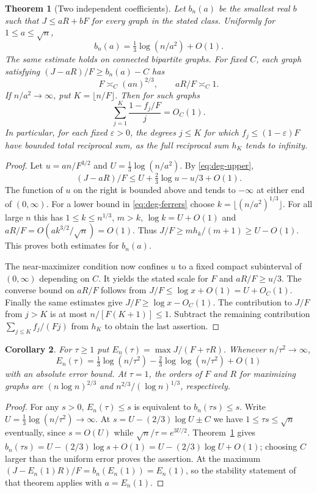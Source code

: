 \documentclass[11pt,a4paper]{article}
\newtheorem{theorem}{Theorem}[section]
\newtheorem{corollary}[theorem]{Corollary}
\theoremstyle{remark}\newtheorem*{remark}{Remark}
\begin{document}
\begin{theorem}[Two independent coefficients]\label{thm:degree-envelope}
Let $b_n(a)$ be the smallest real $b$ such that $J\le aR+bF$ for every
graph in the stated class. Uniformly for $1\le a\le\sqrt n$,
\[
 b_n(a)=\tfrac13\log(n/a^2)+O(1).
\]
The same estimate holds on connected bipartite graphs. For fixed $C$,
each graph satisfying $(J-aR)/F\ge b_n(a)-C$ has
\[
 F\asymp_C(an)^{2/3},\qquad aR/F\asymp_C1 .
\]
If $n/a^2\to\infty$, put $K=\lfloor n/F\rfloor$. Then for such graphs
\[
 \sum_{j=1}^K\frac{1-f_j/F}{j}=O_C(1).
\]
In particular, for each fixed $\varepsilon>0$, the degrees $j\le K$ for
which $f_j\le(1-\varepsilon)F$ have bounded total reciprocal sum, as
the full reciprocal sum $h_K$ tends to infinity.
\end{theorem}
\begin{proof}
Let $u=an/F^{3/2}$ and $U=\tfrac13\log(n/a^2)$.
By \eqref{eq:deg-upper},
\[
 (J-aR)/F\le U+\tfrac23\log u-u/3+O(1).
\]
The function of $u$ on the right is bounded above and tends to
$-\infty$ at either end of $(0,\infty)$. For a lower bound in
\eqref{eq:deg-ferrers} choose $k=\lfloor(n/a^2)^{1/3}\rfloor$.
For all large $n$ this has $1\le k\le n^{1/3}$, $m>k$,
$\log k=U+O(1)$ and $aR/F=O(ak^{3/2}/\sqrt n)=O(1)$.
Thus $J/F\ge mh_k/(m+1)\ge U-O(1)$.
This proves both estimates for $b_n(a)$.

The near-maximizer condition now confines $u$ to a fixed compact
subinterval of $(0,\infty)$ depending on $C$. It yields the stated
scale for $F$ and $aR/F\ge u/3$. The converse bound on $aR/F$ follows
from $J/F\le\log x+O(1)=U+O_C(1)$. Finally the same estimates give
$J/F\ge\log x-O_C(1)$. The contribution to $J/F$ from $j>K$ is at
most $n/[F(K+1)]\le1$. Subtract the remaining contribution
$\sum_{j\le K} f_j/(Fj)$ from $h_K$ to obtain the last assertion.
\end{proof}

\begin{corollary}\label{cor:degree-scaling}
For $\tau\ge1$ put $E_n(\tau)=\max J/(F+\tau R)$. Whenever
$n/\tau^2\to\infty$,
\[
 E_n(\tau)=\tfrac13\log(n/\tau^2)
                  -\tfrac23\log\log(n/\tau^2)+O(1)
\]
with an absolute error bound. At $\tau=1$, the orders of $F$ and $R$
for maximizing graphs are $(n\log n)^{2/3}$ and
$n^{2/3}/(\log n)^{1/3}$, respectively.
\end{corollary}
\begin{proof}
For any $s>0$, $E_n(\tau)\le s$ is equivalent to $b_n(\tau s)\le s$.
Write $U=\tfrac13\log(n/\tau^2)\to\infty$. At
$s=U-(2/3)\log U\pm C$ we have $1\le\tau s\le\sqrt n$ eventually,
since $s=O(U)$ while $\sqrt n/\tau=e^{3U/2}$.
Theorem~\ref{thm:degree-envelope} gives
$b_n(\tau s)=U-(2/3)\log s+O(1)=U-(2/3)\log U+O(1)$;
choosing $C$ larger than the uniform error proves the assertion.
At the maximum $(J- E_n(1)R)/F=b_n(E_n(1))=E_n(1)$, so the stability
statement of that theorem applies with $a=E_n(1)$.
\end{proof}
\end{document}
